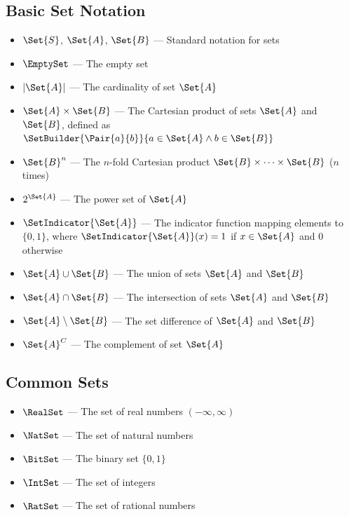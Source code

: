 \subsection{Basic Set Notation}
\begin{itemize}
  \item $\Set{S}$, $\Set{A}$, $\Set{B}$ --- Standard notation for sets
  \item $\EmptySet$ --- The empty set
  \item $|\Set{A}|$ --- The cardinality of set $\Set{A}$
  \item $\Set{A} \times \Set{B}$ --- The Cartesian product of sets $\Set{A}$ and $\Set{B}$, defined as $\SetBuilder{\Pair{a}{b}}{a \in \Set{A} \land b \in \Set{B}}$
  \item $\Set{B}^n$ --- The $n$-fold Cartesian product $\Set{B} \times \cdots \times \Set{B}$ ($n$ times)
  \item $2^{\Set{A}}$ --- The power set of $\Set{A}$
  \item $\SetIndicator{\Set{A}}$ --- The indicator function mapping elements to $\{0,1\}$, where $\SetIndicator{\Set{A}}(x) = 1$ if $x \in \Set{A}$ and $0$ otherwise
  \item $\Set{A} \cup \Set{B}$ --- The union of sets $\Set{A}$ and $\Set{B}$
  \item $\Set{A} \cap \Set{B}$ --- The intersection of sets $\Set{A}$ and $\Set{B}$
  \item $\Set{A} \setminus \Set{B}$ --- The set difference of $\Set{A}$ and $\Set{B}$
  \item $\Set{A}^C$ --- The complement of set $\Set{A}$
\end{itemize}

\subsection{Common Sets}
\begin{itemize}
  \item $\RealSet$ --- The set of real numbers $(-\infty,\infty)$
  \item $\NatSet$ --- The set of natural numbers
  \item $\BitSet$ --- The binary set $\{0,1\}$
  \item $\IntSet$ --- The set of integers
  \item $\RatSet$ --- The set of rational numbers
\end{itemize}

